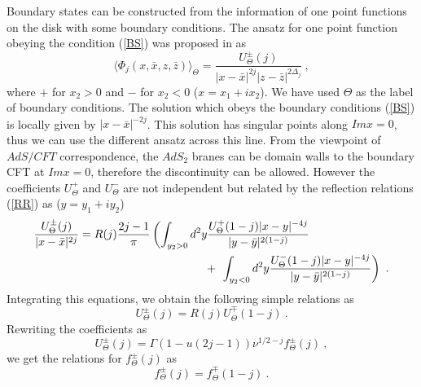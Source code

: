 \documentclass[a4paper,12pt]{article}
\newcommand{\nn}{\nonumber\\}
\begin{document}
Boundary states can be constructed from the information of one point
functions on the disk with some boundary conditions.
The ansatz for one point function obeying the condition (\ref{BS}) was
proposed in \cite{LOP,PST} as
\begin{equation}
 \langle \Phi_j (x , \bar{x} , z, \bar{z}) \rangle _{\Theta}
 = \frac{U^{\pm}_{\Theta}(j) }{|x - \bar{x}|^{2j} |z-\bar{z}|^{2 \Delta_j}} ~,
\end{equation} 
where $+$ for $x_2 > 0$ and $-$ for $x_2 < 0$ ($x = x_1 + i x_2$). 
We have used $\Theta$ as the label of boundary conditions. 
The solution which obeys the boundary conditions (\ref{BS})
is locally given by $|x - \bar{x}|^{-2j}$.  
This solution has singular points along $Im x = 0$,
thus we can use the different ansatz across this line.
From the viewpoint of $AdS/CFT$ correspondence,
the $AdS_2$ branes can be domain walls to the boundary CFT at $Im x =0$,
therefore the discontinuity can be allowed.
However the coefficients $U^+_{\Theta}$ and $U^- _{\Theta}$ are not
independent but 
related by the reflection relations (\ref{RR}) as ($y = y_1 + i y_2$)
\begin{eqnarray}
 \lefteqn{\frac{U^{\pm}_{\Theta} (j)}{|x - \bar{x} | ^{2j}} = 
 R(j) \frac{2j -1}{\pi} \left(
 \int _{y_2 > 0} d^2 y \frac{ U^{+}_{\Theta} (1-j) |x - y |^{-4j}}{
     | y - \bar{y} |^{2(1-j)}} \right.} \nn && \hspace{5cm} +~ \left.
 \int _{y_2 < 0} d^2 y \frac{ U^{-}_{\Theta} (1-j) |x - y |^{-4j}}{
     | y - \bar{y} |^{2(1-j)} } 
\right) ~.
\label{UR} 
\end{eqnarray}
Integrating this equations, we obtain the following simple relations as
\begin{equation}
 U^{\pm} _{\Theta} (j) = R (j) U^{\mp} _{\Theta} (1-j) ~.
\end{equation}
Rewriting the coefficients as
\begin{equation}
 U^{\pm}_{\Theta} (j) = \Gamma (1 - u (2j - 1)) \nu^{1/2 - j} 
 f^{\pm}_{\Theta} (j) ~,
\end{equation}
we get the relations for $ f^{\pm}_{\Theta} (j)$ as 
\begin{equation}
 f^{\pm}_{\Theta} (j) = f^{\mp} _{\Theta} (1-j) ~.
\label{fpm}
\end{equation}
\end{document}
